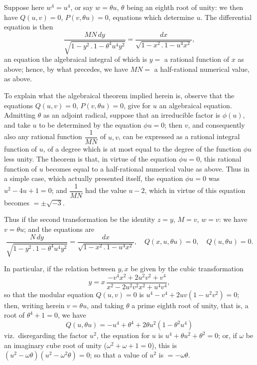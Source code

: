 \documentclass[11pt,a4paper]{article}
\begin{document}
Suppose here $w^{4} = u^{4}$, or say $w = \theta u$, $\theta$ being an eighth root of unity: we then have $Q(u, v) = 0$, $P(v, \theta u) = 0$, equations which determine $u$. The differential equation is then
\[
\frac{MN\,dy}{\sqrt{1 - y^{2}\,.\,1 - \theta^{4}u^{4}y^{2}}} = \frac{dx}{\sqrt{1 - x^{2}\,.\,1 - u^{4}x^{2}}},
\]
an equation the algebraical integral of which is $y =$ a rational function of $x$ as above; hence, by what precedes, we have $MN =$ a half-rational numerical value, as above.

To explain what the algebraical theorem implied herein is, observe that the equations $Q(u, v) = 0$, $P(v, \theta u) = 0$, give for $u$ an algebraical equation. Admitting $\theta$ as an adjoint radical, suppose that an irreducible factor is $\phi(u)$, and take $u$ to be determined by the equation $\phi u = 0$; then $v$, and consequently also any rational function $\dfrac{1}{MN}$ of $u, v$, can be expressed as a rational integral function of $u$, of a degree which is at most equal to the degree of the function $\phi u$ less unity. The theorem is that, in virtue of the equation $\phi u = 0$, this rational function of $u$ becomes equal to a half-rational numerical value as above. Thus in a simple case, which actually presented itself, the equation $\phi u = 0$ was $u^{2} - 4u + 1 = 0$; and $\dfrac{1}{MN}$ had the value $u - 2$, which in virtue of this equation becomes $= \pm\sqrt{-3}$.

\newpage


Thus if the second transformation be the identity $z = y$, $M = v$, $w = v$: we have $v = \theta u$; and the equations are
\[
\frac{N\,dy}{\sqrt{1 - y^{2}\,.\,1 - \theta^{4}u^{4}y^{2}}} = \frac{dx}{\sqrt{1 - x^{2}\,.\,1 - u^{4}x^{2}}}, \quad Q(x, u, \theta u) = 0, \quad Q(u, \theta u) = 0.
\]

In particular, if the relation between $y, x$ be given by the cubic transformation
\[
y = x\,\frac{-v^{4}x^{2} + 2u^{2}v^{2} + v^{4}}{x^{2} - 2u^{2}v^{2}x^{2} + u^{4}v^{4}},
\]
so that the modular equation $Q(u, v) = 0$ is $u^{4} - v^{4} + 2uv(1 - u^{2}v^{2}) = 0$; then, writing herein $v = \theta u$, and taking $\theta$ a prime eighth root of unity, that is, a root of $\theta^{4} + 1 = 0$, we have
\[
Q(u, \theta u) = -u^{4} + \theta^{4} + 2\theta u^{2}(1 - \theta^{2}u^{4})
\]
viz.\ disregarding the factor $u^{2}$, the equation for $u$ is $u^{4} + \theta u^{2} + \theta^{2} = 0$; or, if $\omega$ be an imaginary cube root of unity ($\omega^{2} + \omega + 1 = 0$), this is $(u^{2} - \omega\theta)(u^{2} - \omega^{2}\theta) = 0$; so that a value of $u^{2}$ is $= -\omega\theta$.
\end{document}
